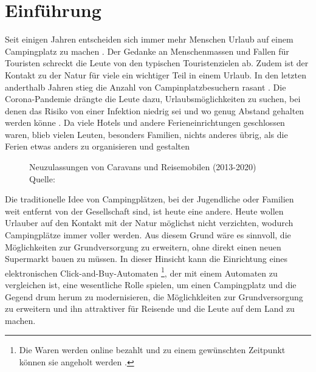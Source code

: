 \section{Einführung}


Seit einigen Jahren entscheiden sich immer mehr Menschen Urlaub auf einem Campingplatz zu machen 
\cite{periodical:ANST}. Der Gedanke an Menschenmassen und Fallen für Touristen schreckt die Leute von 
den typischen Touristenzielen ab. Zudem ist der Kontakt zu der Natur für viele ein wichtiger Teil 
in einem Urlaub. In den letzten anderthalb Jahren stieg die Anzahl von Campinplatzbesuchern rasant
\cite{periodical:UBST}. Die Corona-Pandemie drängte die Leute dazu, Urlaubsmöglichkeiten zu suchen, 
bei denen das Risiko von einer Infektion niedrig sei und wo genug Abstand gehalten werden könne
\cite{periodical:AUST}. Da viele Hotels und andere Ferieneinrichtungen geschlossen waren, blieb 
vielen Leuten, besonders Familien, nichts anderes übrig, als die Ferien etwas anders zu organisieren 
und gestalten 

\vfill
\begin{figure}[H]
    \caption{Neuzulassungen von Caravans und Reisemobilen (2013-2020) \\ Quelle: \cite{periodical:UBST}}
    \label{fig:periodical_ANST}
\end{figure}

Die traditionelle Idee von Campingplätzen, bei der Jugendliche oder Familien weit entfernt von der 
Gesellschaft sind, ist heute eine andere. Heute wollen Urlauber auf den Kontakt mit der Natur
möglichst nicht verzichten, wodurch Campingplätze immer voller werden. Aus diesem Grund wäre es
sinnvoll, die Möglichkeiten zur Grundversorgung zu erweitern, ohne direkt einen neuen Supermarkt
bauen zu müssen. In dieser Hinsicht kann die Einrichtung eines elektronischen Click-and-Buy-Automaten
\footnote{Die Waren werden online bezahlt und zu einem gewünschten Zeitpunkt können sie angeholt
werden \cite{refart:ECPG}.}, der mit einem Automaten zu vergleichen ist, eine wesentliche Rolle 
spielen, um einen Campingplatz und die Gegend drum herum zu modernisieren, die Möglichkleiten 
zur Grundversorgung zu erweitern und ihn attraktiver für Reisende und die Leute auf dem Land zu machen.


